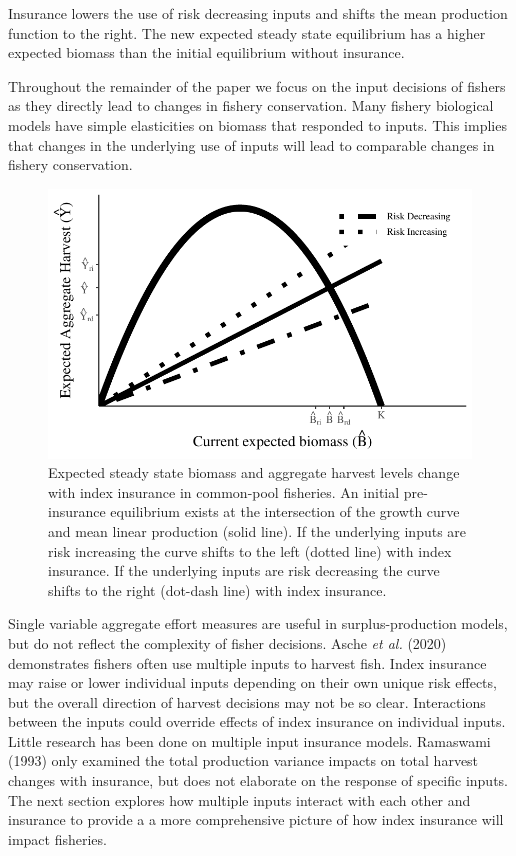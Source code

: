 \documentclass[
  letterpaper,
  DIV=11,
  numbers=noendperiod]{scrartcl}
\theoremstyle{plain}
\theoremstyle{plain}
\theoremstyle{remark}
\begin{document}
Insurance lowers the use of risk decreasing inputs and shifts the mean
production function to the right. The new expected steady state
equilibrium has a higher expected biomass than the initial equilibrium
without insurance.

Throughout the remainder of the paper we focus on the input decisions of
fishers as they directly lead to changes in fishery conservation. Many
fishery biological models have simple elasticities on biomass that
responded to inputs. This implies that changes in the underlying use of
inputs will lead to comparable changes in fishery conservation.

\begin{figure}

{\centering \includegraphics{ibi-behavior_files/figure-pdf/fig-synas-1.pdf}

}

\caption{\label{fig-synas}Expected steady state biomass and aggregate
harvest levels change with index insurance in common-pool fisheries. An
initial pre-insurance equilibrium exists at the intersection of the
growth curve and mean linear production (solid line). If the underlying
inputs are risk increasing the curve shifts to the left (dotted line)
with index insurance. If the underlying inputs are risk decreasing the
curve shifts to the right (dot-dash line) with index insurance.}

\end{figure}

Single variable aggregate effort measures are useful in
surplus-production models, but do not reflect the complexity of fisher
decisions. Asche \emph{et al.} (2020) demonstrates fishers often use
multiple inputs to harvest fish. Index insurance may raise or lower
individual inputs depending on their own unique risk effects, but the
overall direction of harvest decisions may not be so clear. Interactions
between the inputs could override effects of index insurance on
individual inputs. Little research has been done on multiple input
insurance models. Ramaswami (1993) only examined the total production
variance impacts on total harvest changes with insurance, but does not
elaborate on the response of specific inputs. The next section explores
how multiple inputs interact with each other and insurance to provide a
a more comprehensive picture of how index insurance will impact
fisheries.
\end{document}
